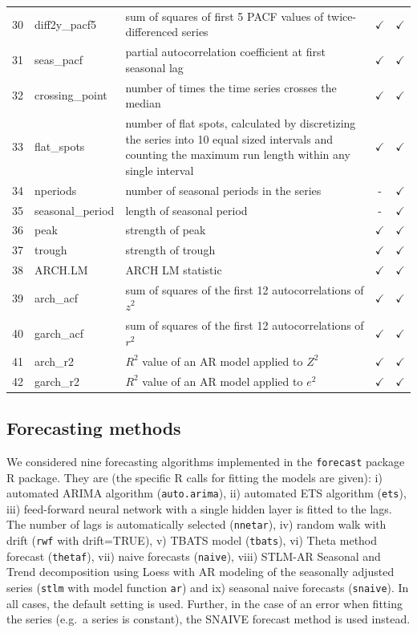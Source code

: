 \documentclass[11pt,a4paper,]{article}
\def\yes{$\checkmark$}
\theoremstyle{definition}
\theoremstyle{definition}
\theoremstyle{definition}
\theoremstyle{remark}
\begin{document}
\begin{table}[!htp]
\begin{tabular}{llp{}cc}
30 & diff2y\_pacf5  & sum of squares of first 5 PACF values of twice-differenced series                       & \yes  & \yes \\
31 & seas\_pacf  & partial autocorrelation coefficient at first seasonal lag                       & \yes  & \yes \\
32 & crossing\_point  & number of times the time series crosses the median                     & \yes  & \yes \\
33 & flat\_spots  & number of flat spots, calculated by discretizing the series into 10 equal sized intervals and counting the maximum run length within any single interval                       & \yes  & \yes \\
34 & nperiods  & number of seasonal periods in the series & -  & \yes \\
35 & seasonal\_period  & length of seasonal period                       & -  & \yes \\
36 & peak  & strength of peak                      & \yes  & \yes \\
37 & trough  & strength of trough                      & \yes  & \yes \\
38 & ARCH.LM  & ARCH LM statistic                      & \yes  & \yes \\
39 & arch\_acf  &    sum of squares of the first 12 autocorrelations of $z^2$               & \yes  & \yes \\
40 & garch\_acf  &  sum of squares of the first 12 autocorrelations of $r^2$                 & \yes  & \yes \\
41 & arch\_r2  &     $R^2$ value of an AR model applied to $Z^2$              & \yes  & \yes \\
42 & garch\_r2  &   $R^2$ value of an AR model applied to $e^2$                 & \yes  & \yes \\
\bottomrule
 \end{tabular}
\end{table}

\subsection{Forecasting methods}\label{forecasting-methods}

We considered nine forecasting algorithms implemented in the
\texttt{forecast} \autocite{forecast} package R package. They are (the
specific R calls for fitting the models are given): i) automated ARIMA
algorithm (\texttt{auto.arima}), ii) automated ETS algorithm
(\texttt{ets}), iii) feed-forward neural network with a single hidden
layer is fitted to the lags. The number of lags is automatically
selected (\texttt{nnetar}), iv) random walk with drift (\texttt{rwf}
with drift=TRUE), v) TBATS model (\texttt{tbats}), vi) Theta method
forecast (\texttt{thetaf}), vii) naive forecasts (\texttt{naive}), viii)
STLM-AR Seasonal and Trend decomposition using Loess with AR modeling of
the seasonally adjusted series (\texttt{stlm} with model function
\texttt{ar}) and ix) seasonal naive forecasts (\texttt{snaive}). In all
cases, the default setting is used. Further, in the case of an error
when fitting the series (e.g.~a series is constant), the SNAIVE forecast
method is used instead.
\end{document}

